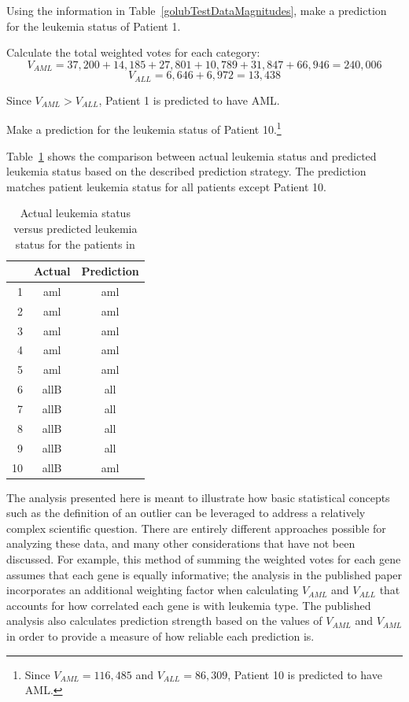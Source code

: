 \begin{example}{Using the information in Table~\ref{golubTestDataMagnitudes}, make a prediction for the leukemia status of Patient 1.}
	
Calculate the total weighted votes for each category:
\[V_{AML} = 37,200 + 14,185 + 27,801 + 10,789 + 31,847 + 66,946 = 240,006 \]
\[V_{ALL} = 6,646 + 6,972 = 13,438 \]	

Since $V_{AML} > V_{ALL}$, Patient 1 is predicted to have AML. 	
	
\end{example}

\begin{exercise}{Make a prediction for the leukemia status of Patient 10.\footnote{Since $V_{AML} = 116,485$ and $V_{ALL} = 86,309$, Patient 10 is predicted to have AML.}}
\end{exercise}

Table~\ref{golubActualPrediction} shows the comparison between actual leukemia status and predicted leukemia status based on the described prediction strategy. The prediction matches patient leukemia status for all patients except Patient 10. 

\begin{table}[ht]
	\centering
	\small
	\begin{tabular}{r|cc}
		\hline
		& Actual & Prediction \\ 
		\hline
		1 & aml & aml \\ 
		2 & aml & aml \\ 
		3 & aml & aml \\ 
		4 & aml & aml \\ 
		5 & aml & aml \\ 
		6 & allB & all \\ 
		7 & allB & all \\ 
		8 & allB & all \\ 
		9 & allB & all \\ 
		10 & allB & aml \\ 
		\hline
	\end{tabular}
	\caption{Actual leukemia status versus predicted leukemia status for the patients in  \label{golubActualPrediction}}
\end{table}

The analysis presented here is meant to illustrate how basic statistical concepts such as the definition of an outlier can be leveraged to address a relatively complex scientific question. There are entirely different approaches possible for analyzing these data, and many other considerations that have not been discussed. For example, this method of summing the weighted votes for each gene assumes that each gene is equally informative; the analysis in the published paper incorporates an additional weighting factor when calculating $V_{AML}$ and $V_{ALL}$ that accounts for how correlated each gene is with leukemia type. The published analysis also calculates prediction strength based on the values of $V_{AML}$ and $V_{AML}$ in order to provide a measure of how reliable each prediction is. 

